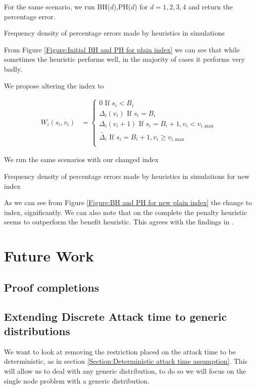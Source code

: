 \documentclass[a4paper,10pt]{article}
\theoremstyle{definition}
\theoremstyle{definition}
\theoremstyle{remark}
\theoremstyle{definition}
\begin{document}
For the same scenario, we run BH($d$),PH($d$) for $d=1,2,3,4$ and return the percentage error.

\begin{myfigure}
\label{Figure:Initial BH and PH for plain index}

\caption{Frequency density of percentage errors made by heuristics in simulations}
\end{myfigure}

From Figure \ref{Figure:Initial BH and PH for plain index} we can see that while sometimes the heuristic performs well, in the majority of cases it performs very badly.

We propose altering the index to

\begin{align}
W_{i}(s_{i},v_{i})&=\begin{cases}
0 \text{ If } s_{i}<B_{i} \\
\Delta_{i}(v_{i}) \text{ If } s_{i}=B_{i} \\
\Delta_{i}(v_{i}+1) \text{ If } s_{i}=B_{i}+1 , v_{i} < v_{i,\text{max}} \\
\widetilde{\Delta_{i}} \text{ If } s_{i}=B_{i}+1, v_{i} \geq v_{i,\text{max}} \\
\end{cases}
\end{align}

We run the same scenarios with our changed index

\begin{myfigure}
\label{Figure:BH and PH for new plain index}

\caption{Frequency density of percentage errors made by heuristics in simulations for new index}
\end{myfigure}

As we can see from Figure \ref{Figure:BH and PH for new plain index} the change to index, significantly. We can also note that on the complete the penalty heuristic seems to outperform the benefit heuristic. This agrees with the findings in \cite{Lin2013}.

\section{Future Work}
\subsection{Proof completions}

\subsection{Extending Discrete Attack time to generic distributions}
We want to look at removing the restriction placed on the attack time to be deterministic, as in section \ref{Section:Deterministic attack time assumption}. This will allow us to deal with any generic distribution, to do so we will focus on the single node problem with a generic distribution.
\end{document}

